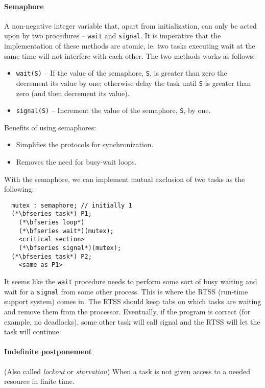 \paragraph{Semaphore} A non-negative integer variable that, apart from initialization, can only be acted upon by two procedures -- \verb|wait| and \verb|signal|. It is imperative that the implementation of these methods are atomic, ie. two tasks executing wait at the same time will not interfere with each other. The two methods works as follows:
\begin{itemize}[nolistsep,noitemsep]
  \item \verb|wait(S)| -- If the value of the semaphore, \verb|S|, is greater than zero the decrement its value by one; otherwise delay the task until \verb|S| is greater than zero (and then decrement its value).
  \item \verb|signal(S)| -- Increment the value of the semaphore, \verb|S|, by one.
\end{itemize}

Benefits of using semaphores:
\begin{itemize}[nolistsep,noitemsep]
  \item Simplifies the protocols for synchronization.
  \item Removes the need for busy-wait loops.
\end{itemize}

With the semaphore, we can implement mutual exclusion of two tasks as the following:
%
\begin{lstlisting}
  mutex : semaphore; // initially 1
  (*\bfseries task*) P1;
    (*\bfseries loop*)
    (*\bfseries wait*)(mutex);
    <critical section>
    (*\bfseries signal*)(mutex);
  (*\bfseries task*) P2;
    <same as P1>
\end{lstlisting}

It seems like the \verb|wait| procedure needs to perform some sort of busy waiting and wait for a \verb|signal| from some other process. This is where the RTSS (run-time support system) comes in. The RTSS should keep tabs on which tasks are waiting and remove them from the processor. Eventually, if the program is correct (for example, no deadlocks), some other task will call signal and the RTSS will let the task will continue.

\paragraph{Indefinite postponement} (Also called \textit{lockout} or \textit{starvation}) When a task is not given access to a needed resource in finite time.

